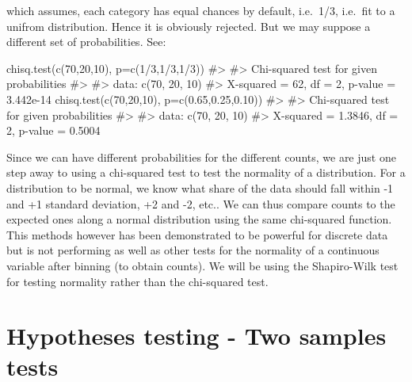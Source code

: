 \documentclass[
  letterpaper,
  DIV=11,
  numbers=noendperiod]{scrreprt}
\newenvironment{Shaded}{\begin{snugshade}}{\end{snugshade}}
\newcommand{\AttributeTok}[1]{\textcolor[rgb]{0.40,0.45,0.13}{#1}}
\newcommand{\CommentTok}[1]{\textcolor[rgb]{0.37,0.37,0.37}{#1}}
\newcommand{\DecValTok}[1]{\textcolor[rgb]{0.68,0.00,0.00}{#1}}
\newcommand{\FloatTok}[1]{\textcolor[rgb]{0.68,0.00,0.00}{#1}}
\newcommand{\FunctionTok}[1]{\textcolor[rgb]{0.28,0.35,0.67}{#1}}
\newcommand{\NormalTok}[1]{\textcolor[rgb]{0.00,0.23,0.31}{#1}}
\newcommand{\SpecialCharTok}[1]{\textcolor[rgb]{0.37,0.37,0.37}{#1}}
\begin{document}
which assumes, each category has equal chances by default, i.e.~1/3,
i.e.~fit to a unifrom distribution. Hence it is obviously rejected. But
we may suppose a different set of probabilities. See:

\begin{Shaded}
\begin{Highlighting}[]
\FunctionTok{chisq.test}\NormalTok{(}\FunctionTok{c}\NormalTok{(}\DecValTok{70}\NormalTok{,}\DecValTok{20}\NormalTok{,}\DecValTok{10}\NormalTok{), }\AttributeTok{p=}\FunctionTok{c}\NormalTok{(}\DecValTok{1}\SpecialCharTok{/}\DecValTok{3}\NormalTok{,}\DecValTok{1}\SpecialCharTok{/}\DecValTok{3}\NormalTok{,}\DecValTok{1}\SpecialCharTok{/}\DecValTok{3}\NormalTok{))}
\CommentTok{\#\textgreater{} }
\CommentTok{\#\textgreater{}  Chi{-}squared test for given probabilities}
\CommentTok{\#\textgreater{} }
\CommentTok{\#\textgreater{} data:  c(70, 20, 10)}
\CommentTok{\#\textgreater{} X{-}squared = 62, df = 2, p{-}value = 3.442e{-}14}
\FunctionTok{chisq.test}\NormalTok{(}\FunctionTok{c}\NormalTok{(}\DecValTok{70}\NormalTok{,}\DecValTok{20}\NormalTok{,}\DecValTok{10}\NormalTok{), }\AttributeTok{p=}\FunctionTok{c}\NormalTok{(}\FloatTok{0.65}\NormalTok{,}\FloatTok{0.25}\NormalTok{,}\FloatTok{0.10}\NormalTok{))}
\CommentTok{\#\textgreater{} }
\CommentTok{\#\textgreater{}  Chi{-}squared test for given probabilities}
\CommentTok{\#\textgreater{} }
\CommentTok{\#\textgreater{} data:  c(70, 20, 10)}
\CommentTok{\#\textgreater{} X{-}squared = 1.3846, df = 2, p{-}value = 0.5004}
\end{Highlighting}
\end{Shaded}

Since we can have different probabilities for the different counts, we
are just one step away to using a chi-squared test to test the normality
of a distribution. For a distribution to be normal, we know what share
of the data should fall within -1 and +1 standard deviation, +2 and -2,
etc.. We can thus compare counts to the expected ones along a normal
distribution using the same chi-squared function. This methods however
has been demonstrated to be powerful for discrete data but is not
performing as well as other tests for the normality of a continuous
variable after binning (to obtain counts). We will be using the
Shapiro-Wilk test for testing normality rather than the chi-squared
test.

\chapter{Hypotheses testing - Two samples
tests}\label{hypotheses-testing---two-samples-tests}
\end{document}
